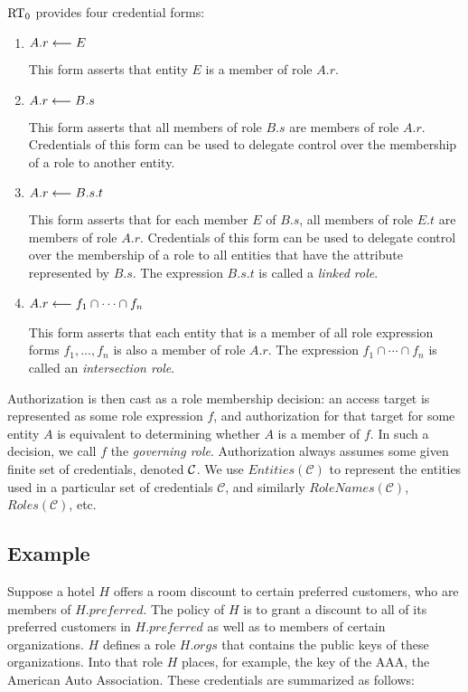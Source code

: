 \newpage
$\RT_0$ provides four credential forms: 
\begin{enumerate}

\item $\cred{A.r}{E}{}$ 

 This form asserts that entity $E$ is a member of role $A.r$.

\item $\cred{A.r}{B.s}{}$ 

  This form asserts that all members of role $B.s$
  are members of role $A.r$. Credentials of this form can be used to
  delegate control over the membership of a role to another entity.

\item $\cred{A.r}{B.s.t}{}$ 

  This form asserts that for each member $E$ of
  $B.s$, all members of role $E.t$ are members of role
  $A.r$. Credentials of this form can be used to delegate control over
  the membership of a role to all entities that have the attribute
  represented by $B.s$.  The expression $B.s.t$ is called a 
  \emph{linked role}.

\item $\cred{A.r}{f_1 \cap \cdots \cap f_n}{}$
  
  This form asserts that each entity that is a member of all role
  expression forms $f_1,\ldots, f_n$ is also a member of role
  $A.r$. The expression $f_1 \cap \cdots \cap f_n$ is called an
  \emph{intersection role}.

\end{enumerate}
Authorization is then cast as a role membership decision: an access
target is represented as some role expression $f$, and authorization
for that target for some entity $A$ is equivalent to determining
whether $A$ is a member of $f$.  In such a decision, we call $f$ the
\emph{governing role}.  Authorization always assumes some given finite
set of credentials, denoted $\creds$.  We use
$\mathit{Entities(\mathcal{C})}$ to represent the entities used in a
particular set of credentials $\mathcal{C}$, and similarly
$\mathit{RoleNames(\mathcal{C})}$, $\mathit{Roles(\mathcal{C})}$, etc.

\subsection{Example}
\label{section-rt-example}

Suppose a hotel $H$ offers a room discount to certain preferred
customers, who are members of $H.\mathit{preferred}$. The policy of
$H$ is to grant a discount to all of its preferred customers in
$H.\mathit{preferred}$ as well as to members of certain organizations.
$H$ defines a role $H.\mathit{orgs}$ that contains the public keys of
these organizations. Into that role $H$ places, for example, the key
of the AAA, the American Auto Association. These
credentials are summarized as follows:
\begin{mathpar}


\end{mathpar}

